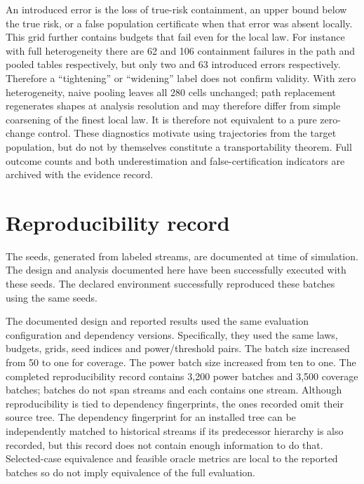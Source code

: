 \begin{table}[!htbp]\centering\small
\caption{Foreign-information effects relative to the local analysis. Each row sums to 280. NC: no change; BT: tightening without a newly introduced error; CW: widening; EB: newly introduced erroneous bound; MI: model incompatible. Labels classify relative effects, not validity under the local true law.}\label{tab:foreign}

\end{table}

An introduced error is the loss of true-risk containment, an upper bound below the true risk, or a false population certificate when that error was absent locally. This grid further contains budgets that fail even for the local law. For instance with full heterogeneity there are 62 and 106 containment failures in the path and pooled tables respectively, but only two and 63 introduced errors respectively. Therefore a ``tightening'' or ``widening'' label does not confirm validity. With zero heterogeneity, naive pooling leaves all 280 cells unchanged; path replacement regenerates shapes at analysis resolution and may therefore differ from simple coarsening of the finest local law. It is therefore not equivalent to a pure zero-change control. These diagnostics motivate using trajectories from the target population, but do not by themselves constitute a transportability theorem. Full outcome counts and both underestimation and false-certification indicators are archived with the evidence record.

\section{Reproducibility record} 
The seeds, generated from labeled streams, are documented at time of simulation. The design and analysis documented here have been successfully executed with these seeds. The declared environment successfully reproduced these batches using the same seeds.

The documented design and reported results used the same evaluation configuration and dependency versions. Specifically, they used the same laws, budgets, grids, seed indices and power/threshold pairs. The batch size increased from 50 to one for coverage. The power batch size increased from ten to one. The completed reproducibility record contains 3,200 power batches and 3,500 coverage batches; batches do not span streams and each contains one stream. Although reproducibility is tied to dependency fingerprints, the ones recorded omit their source tree. The dependency fingerprint for an installed tree can be independently matched to historical streams if its predecessor hierarchy is also recorded, but this record does not contain enough information to do that. Selected-case equivalence and feasible oracle metrics are local to the reported batches so do not imply equivalence of the full evaluation.

